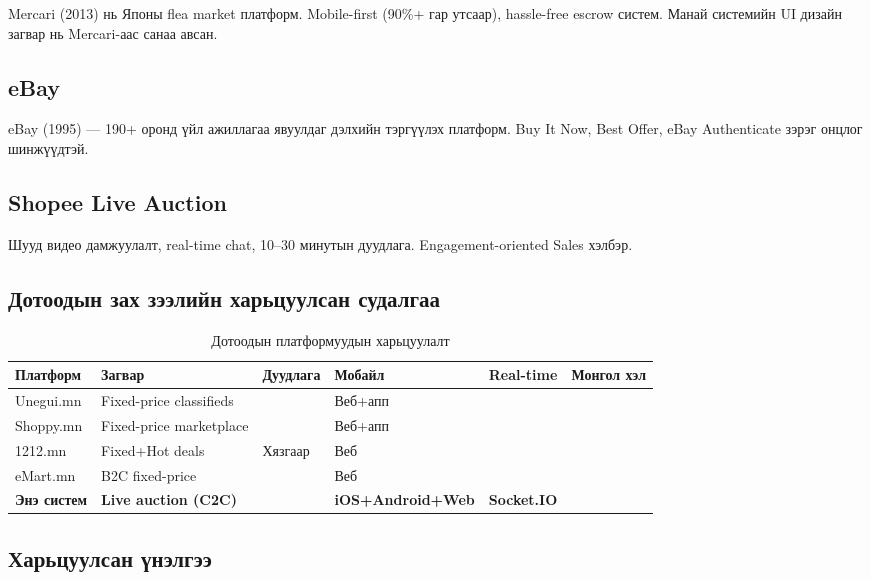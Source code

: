 \documentclass[12pt, a4paper]{report}
\begin{document}
Mercari (2013) нь Японы flea market платформ. Mobile-first (90\%+ гар утсаар), hassle-free escrow систем. Манай системийн UI дизайн загвар нь Mercari-аас санаа авсан.

\subsection{eBay}

eBay (1995) — 190+ оронд үйл ажиллагаа явуулдаг дэлхийн тэргүүлэх платформ. Buy It Now, Best Offer, eBay Authenticate зэрэг онцлог шинжүүдтэй.

\subsection{Shopee Live Auction}

Шууд видео дамжуулалт, real-time chat, 10--30 минутын дуудлага. Engagement-oriented Sales хэлбэр.

\subsection{Дотоодын зах зээлийн харьцуулсан судалгаа}

\begin{table}[H]
  \centering
  \caption{Дотоодын платформуудын харьцуулалт}
  \label{tab:domestic-comparison}
  \begin{tabularx}{\textwidth}{L{2.5cm}L{3cm}C{2cm}C{1.5cm}C{1.8cm}C{2cm}}
    \toprule
    \textbf{Платформ} & \textbf{Загвар} & \textbf{Дуудлага} & \textbf{Мобайл} & \textbf{Real-time} & \textbf{Монгол хэл} \\
    \midrule
    Unegui.mn & Fixed-price classifieds &  & Веб+апп &  &  \\
    Shoppy.mn & Fixed-price marketplace &  & Веб+апп &  &  \\
    1212.mn & Fixed+Hot deals & Хязгаар & Веб &  &  \\
    eMart.mn & B2C fixed-price &  & Веб &  &  \\
    \textbf{Энэ систем} & \textbf{Live auction (C2C)} & \textbf{} & \textbf{iOS+Android+Web} & \textbf{ Socket.IO} & \textbf{} \\
    \bottomrule
  \end{tabularx}
\end{table}

\subsection{Харьцуулсан үнэлгээ}
\end{document}
